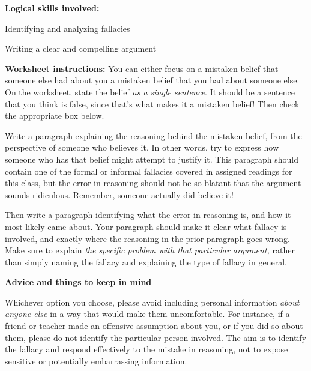 \documentclass[oneside, openany]{book} %
\begin{document}
\noindent \textbf{Logical skills involved:}

\noindent

\noindent Identifying and analyzing fallacies

\noindent

\noindent Writing a clear and compelling argument

\noindent

\noindent

\noindent \textbf{Worksheet instructions: }You can either focus on a mistaken belief that someone else had about you  a mistaken belief that you had about someone else. On 
the worksheet, state the belief \textit{as a single sentence}. It should be a sentence that you think is false, since that's what makes it a mistaken belief! Then check the appropriate 
box below.

\noindent

\noindent Write a paragraph explaining the reasoning behind the mistaken belief, from the perspective of someone who believes it. In other words, try to express how someone who has that 
belief might attempt to justify it. This paragraph should contain one of the formal or informal fallacies covered in assigned readings for this class, but the error in reasoning should 
not be so blatant that the argument sounds ridiculous. Remember, someone actually did believe it!

\noindent

\noindent Then write a paragraph identifying what the error in reasoning is, and how it most likely came about. Your paragraph should make it clear what fallacy is involved, and exactly 
where the reasoning in the prior paragraph goes wrong. Make sure to explain \textit{the specific problem with that particular argument, }rather than simply naming the fallacy and 
explaining the type of fallacy in general.

\noindent \textbf{Advice and things to keep in mind}

\noindent

\noindent

\noindent

\noindent Whichever option you choose, please avoid including personal information \textit{about anyone else }in a way that would make them uncomfortable. For instance, if a friend or 
teacher made an offensive assumption about you, or if you did so about them, please do not identify the particular person involved. The aim is to identify the fallacy and respond 
effectively to the mistake in reasoning, not to expose sensitive or potentially embarrassing information.
\end{document}
